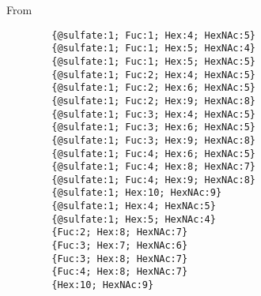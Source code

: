     From \philbs
    \begin{verbatim}
        {@sulfate:1; Fuc:1; Hex:4; HexNAc:5}
        {@sulfate:1; Fuc:1; Hex:5; HexNAc:4}
        {@sulfate:1; Fuc:1; Hex:5; HexNAc:5}
        {@sulfate:1; Fuc:2; Hex:4; HexNAc:5}
        {@sulfate:1; Fuc:2; Hex:6; HexNAc:5}
        {@sulfate:1; Fuc:2; Hex:9; HexNAc:8}
        {@sulfate:1; Fuc:3; Hex:4; HexNAc:5}
        {@sulfate:1; Fuc:3; Hex:6; HexNAc:5}
        {@sulfate:1; Fuc:3; Hex:9; HexNAc:8}
        {@sulfate:1; Fuc:4; Hex:6; HexNAc:5}
        {@sulfate:1; Fuc:4; Hex:8; HexNAc:7}
        {@sulfate:1; Fuc:4; Hex:9; HexNAc:8}
        {@sulfate:1; Hex:10; HexNAc:9}
        {@sulfate:1; Hex:4; HexNAc:5}
        {@sulfate:1; Hex:5; HexNAc:4}
        {Fuc:2; Hex:8; HexNAc:7}
        {Fuc:3; Hex:7; HexNAc:6}
        {Fuc:3; Hex:8; HexNAc:7}
        {Fuc:4; Hex:8; HexNAc:7}
        {Hex:10; HexNAc:9}
    \end{verbatim}